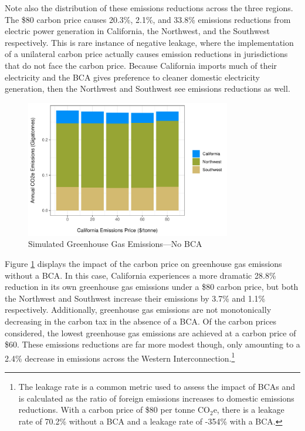 Note also the distribution of these emissions reductions across the three regions. The \$80 carbon price causes 20.3\%, 2.1\%, and 33.8\% emissions reductions from electric power generation in California, the Northwest, and the Southwest respectively. This is rare instance of negative leakage, where the implementation of a unilateral carbon price actually causes emission reductions in jurisdictions that do not face the carbon price. Because California imports much of their electricity and the BCA gives preference to cleaner domestic electricity generation, then the Northwest and Southwest see emissions reductions as well. 

\begin{figure}
    \centering
    \caption{Simulated Greenhouse Gas Emissions---No BCA\label{sim_co2e_nobca}}
    \includegraphics[width=0.8\textwidth]{figures/chapter5_figures/sim_co2e_nobca.pdf}
\end{figure}

Figure \ref{sim_co2e_nobca} displays the impact of the carbon price on greenhouse gas emissions without a BCA. In this case, California experiences a more dramatic 28.8\% reduction in its own greenhouse gas emissions under a \$80 carbon price, but both the Northwest and Southwest increase their emissions by 3.7\% and 1.1\% respectively. Additionally, greenhouse gas emissions are not monotonically decreasing in the carbon tax in the absence of a BCA. Of the carbon prices considered, the lowest greenhouse gas emissions are achieved at a carbon price of \$60. These emissions reductions are far more modest though, only amounting to a 2.4\% decrease in emissions across the Western Interconnection.\footnote{The leakage rate is a common metric used to assess the impact of BCAs and is calculated as the ratio of foreign emissions increases to domestic emissions reductions. With a carbon price of \$80 per tonne CO$_2$e, there is a leakage rate of 70.2\% without a BCA and a leakage rate of -354\% with a BCA.}

